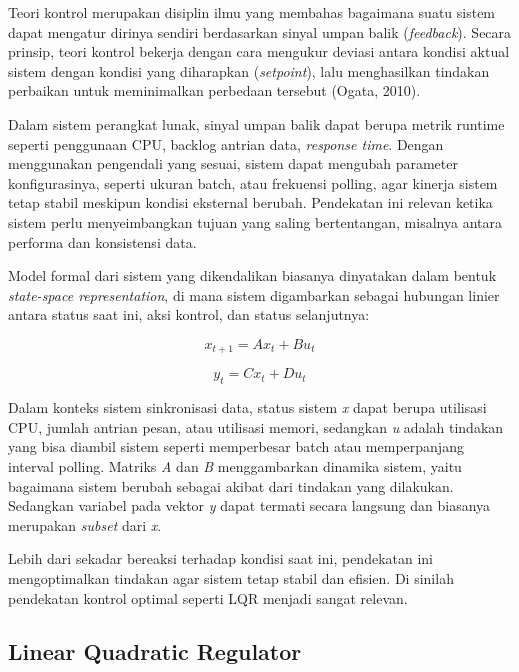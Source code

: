 Teori kontrol merupakan disiplin ilmu yang membahas bagaimana suatu sistem dapat mengatur dirinya sendiri berdasarkan sinyal umpan balik (\emph{feedback}).
Secara prinsip, teori kontrol bekerja dengan cara mengukur deviasi antara kondisi aktual sistem dengan kondisi yang diharapkan (\emph{setpoint}), lalu menghasilkan tindakan perbaikan untuk meminimalkan perbedaan tersebut (Ogata, 2010).

Dalam sistem perangkat lunak, sinyal umpan balik dapat berupa metrik runtime seperti penggunaan CPU, backlog antrian data, \emph{response time}.
Dengan menggunakan pengendali yang sesuai, sistem dapat mengubah parameter konfigurasinya, seperti ukuran batch, atau frekuensi polling, agar kinerja sistem tetap stabil meskipun kondisi eksternal berubah.
Pendekatan ini relevan ketika sistem perlu menyeimbangkan tujuan yang saling bertentangan, misalnya antara performa dan konsistensi data.

Model formal dari sistem yang dikendalikan biasanya dinyatakan dalam bentuk \emph{state-space representation}, di mana sistem digambarkan sebagai hubungan linier antara status saat ini, aksi kontrol, dan status selanjutnya:

\begin{equation}
x_{t + 1} = Ax_{t} + Bu_{t}
\label{eq:state-space}
\end{equation}

\begin{equation}
y_{t} = Cx_{t} + Du_{t}
\label{eq:output}
\end{equation}

Dalam konteks sistem sinkronisasi data, status sistem \emph{x} dapat berupa utilisasi CPU, jumlah antrian pesan, atau utilisasi memori, sedangkan \emph{u} adalah tindakan yang bisa diambil sistem seperti memperbesar batch atau memperpanjang interval polling.
Matriks \emph{A} dan \emph{B} menggambarkan dinamika sistem, yaitu bagaimana sistem berubah sebagai akibat dari tindakan yang dilakukan.
Sedangkan variabel pada vektor \emph{y} dapat termati secara langsung dan biasanya merupakan \emph{subset} dari \emph{x}.

Lebih dari sekadar bereaksi terhadap kondisi saat ini, pendekatan ini mengoptimalkan tindakan agar sistem tetap stabil dan efisien.
Di sinilah pendekatan kontrol optimal seperti LQR menjadi sangat relevan.

\subsection{Linear Quadratic Regulator}

